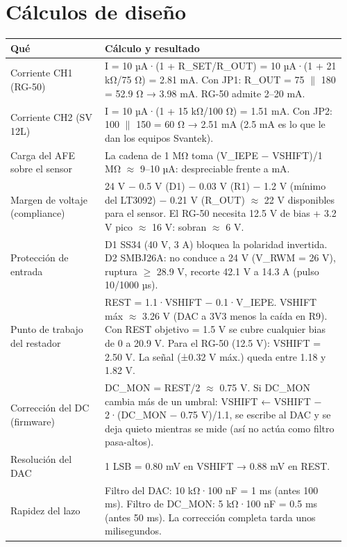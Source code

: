 \documentclass[10pt,a4paper]{article}
\begin{document}
\section{Cálculos de diseño}
\begin{longtable}{@{}L{0.27\linewidth}L{0.69\linewidth}@{}}\toprule
\textbf{Qué} & \textbf{Cálculo y resultado}\\\midrule\endhead
Corriente CH1 (RG-50) & I = 10 µA·(1 + R\_\allowbreak{}SET/R\_\allowbreak{}OUT) = 10 µA·(1 + 21 kΩ/75 Ω) = 2.81 mA. Con JP1: R\_\allowbreak{}OUT = 75 \ensuremath{\parallel} 180 = 52.9 Ω → 3.98 mA. RG-50 admite 2–20 mA.\\[2pt]
Corriente CH2 (SV 12L) & I = 10 µA·(1 + 15 kΩ/100 Ω) = 1.51 mA. Con JP2: 100 \ensuremath{\parallel} 150 = 60 Ω → 2.51 mA (2.5 mA es lo que le dan los equipos Svantek).\\[2pt]
Carga del AFE sobre el sensor & La cadena de 1 MΩ toma (V\_\allowbreak{}IEPE − VSHIFT)/1 MΩ \ensuremath{\approx} 9–10 µA: despreciable frente a mA.\\[2pt]
Margen de voltaje (compliance) & 24 V − 0.5 V (D1) − 0.03 V (R1) − 1.2 V (mínimo del LT3092) − 0.21 V (R\_\allowbreak{}OUT) \ensuremath{\approx} 22 V disponibles para el sensor. El RG-50 necesita 12.5 V de bias + 3.2 V pico \ensuremath{\approx} 16 V: sobran \ensuremath{\approx} 6 V.\\[2pt]
Protección de entrada & D1 SS34 (40 V, 3 A) bloquea la polaridad invertida. D2 SMBJ26A: no conduce a 24 V (V\_\allowbreak{}RWM = 26 V), ruptura \ensuremath{\geq} 28.9 V, recorte 42.1 V a 14.3 A (pulso 10/1000 µs).\\[2pt]
Punto de trabajo del restador & REST = 1.1·VSHIFT − 0.1·V\_\allowbreak{}IEPE. VSHIFT máx \ensuremath{\approx} 3.26 V (DAC a 3V3 menos la caída en R9). Con REST objetivo = 1.5 V se cubre cualquier bias de 0 a 20.9 V. Para el RG-50 (12.5 V): VSHIFT = 2.50 V. La señal (±0.32 V máx.) queda entre 1.18 y 1.82 V.\\[2pt]
Corrección del DC (firmware) & DC\_\allowbreak{}MON = REST/2 \ensuremath{\approx} 0.75 V. Si DC\_\allowbreak{}MON cambia más de un umbral: VSHIFT ← VSHIFT − 2·(DC\_\allowbreak{}MON − 0.75 V)/1.1, se escribe al DAC y se deja quieto mientras se mide (así no actúa como filtro pasa-altos).\\[2pt]
Resolución del DAC & 1 LSB = 0.80 mV en VSHIFT → 0.88 mV en REST.\\[2pt]
Rapidez del lazo & Filtro del DAC: 10 kΩ·100 nF = 1 ms (antes 100 ms). Filtro de DC\_\allowbreak{}MON: 5 kΩ·100 nF = 0.5 ms (antes 50 ms). La corrección completa tarda unos milisegundos.\\[2pt]

\end{longtable}
\end{document}
